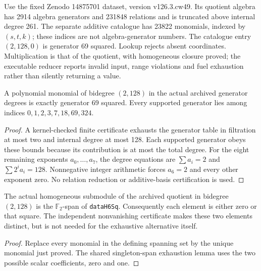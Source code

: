 \begin{definition}
  \label{def:lin-e2-catalogue}
  \notready
  Use the fixed Zenodo 14875701 dataset, version v126.3.cw49.
  Its quotient algebra has 2914 algebra
  generators and 231848 relations and is truncated above internal degree 261.
  The separate additive catalogue has 23822 monomials, indexed by $(s,t,k)$;
  these indices are not algebra-generator numbers. The catalogue entry
  $(2,128,0)$ is generator 69 squared. Lookup rejects absent coordinates.
  Multiplication is that of the quotient, with homogeneous closure proved;
  the executable reducer reports invalid input, range violations and fuel
  exhaustion rather than silently returning a value.
\end{definition}

\begin{proposition}
  \label{prop:lin-square-degree-unique}
  \leanok
  A polynomial monomial of bidegree $(2,128)$ in the actual archived
  generator degrees is exactly generator 69 squared. Every supported
  generator lies among indices $0,1,2,3,7,18,69,324$.
\end{proposition}
\begin{proof}
  A kernel-checked finite certificate exhausts the generator table in
  filtration at most two and internal degree at most 128. Each supported
  generator obeys these bounds because its contribution is at most the
  total degree. For the eight remaining exponents $a_0,\ldots,a_7$, the
  degree equations are $\sum a_i=2$ and
  $\sum 2^i a_i=128$. Nonnegative integer arithmetic forces $a_6=2$
  and every other exponent zero. No relation reduction or additive-basis
  certification is used.
  \leanok
\end{proof}

\begin{proposition}
  \label{prop:lin-square-component-two-elements}
  \leanok
  The actual homogeneous submodule of the archived quotient in bidegree
  $(2,128)$ is the $\mathbb F_2$-span of \texttt{dataH6Sq}. Consequently
  each element is either zero or that square. The independent nonvanishing
  certificate makes these two elements distinct, but is not needed for
  the exhaustive alternative itself.
\end{proposition}
\begin{proof}
  Replace every monomial in the defining spanning set by the unique
  monomial just proved. The shared singleton-span exhaustion lemma uses the
  two possible scalar coefficients, zero and one.
  \leanok
\end{proof}

